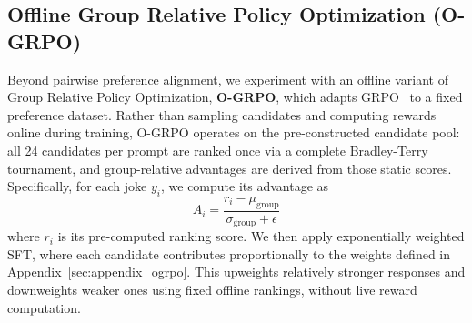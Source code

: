\documentclass[11pt]{article}
\begin{document}
\subsection{Offline Group Relative Policy Optimization (O-GRPO)}
Beyond pairwise preference alignment, we experiment with an offline variant of Group Relative Policy Optimization, \textbf{O-GRPO}, which adapts GRPO~\cite{shao2024deepseekmath} to a fixed preference dataset. Rather than sampling candidates and computing rewards online during training, O-GRPO operates on the pre-constructed candidate pool: all 24 candidates per prompt are ranked once via a complete Bradley-Terry tournament, and group-relative advantages are derived from those static scores. Specifically, for each joke $y_i$, we compute its advantage as
\begin{equation}
A_i = \frac{r_i - \mu_{\mathrm{group}}}{\sigma_{\mathrm{group}} + \epsilon}
\label{eq:ogrpo_main}
\end{equation}
where $r_i$ is its pre-computed ranking score. We then apply exponentially weighted SFT, where each candidate contributes proportionally to the weights defined in Appendix~\ref{sec:appendix_ogrpo}. This upweights relatively stronger responses and downweights weaker ones using fixed offline rankings, without live reward computation.




\end{document}
